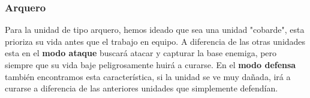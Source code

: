 \subsubsection{Arquero}
Para la unidad de tipo arquero, hemos ideado que sea una unidad "cobarde", esta prioriza su vida antes que el trabajo en equipo. A diferencia de las otras unidades esta en el \textbf{modo ataque} buscará atacar y capturar la base enemiga, pero siempre que su vida baje peligrosamente huirá a curarse. En el \textbf{modo defensa} también encontramos esta característica, si la unidad se ve muy dañada, irá a curarse a diferencia de las anteriores unidades que simplemente defendían.

\begin{figure}[H]
    \centering
\end{figure}
